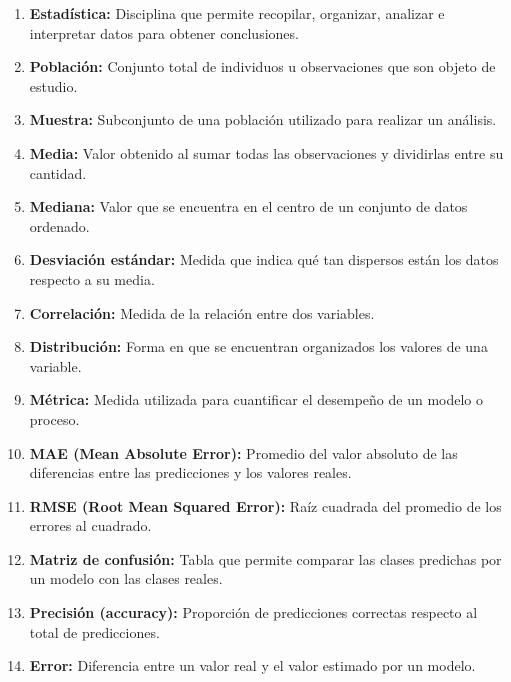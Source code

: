 \documentclass[11pt,letterpaper,DIV=12]{scrartcl}
\begin{document}
\begin{enumerate}
  \item \textbf{Estadística:} Disciplina que permite recopilar, organizar, analizar e interpretar datos para obtener conclusiones.
  \item \textbf{Población:} Conjunto total de individuos u observaciones que son objeto de estudio.
  \item \textbf{Muestra:} Subconjunto de una población utilizado para realizar un análisis.
  \item \textbf{Media:} Valor obtenido al sumar todas las observaciones y dividirlas entre su cantidad.
  \item \textbf{Mediana:} Valor que se encuentra en el centro de un conjunto de datos ordenado.
  \item \textbf{Desviación estándar:} Medida que indica qué tan dispersos están los datos respecto a su media.
  \item \textbf{Correlación:} Medida de la relación entre dos variables.
  \item \textbf{Distribución:} Forma en que se encuentran organizados los valores de una variable.
  \item \textbf{Métrica:} Medida utilizada para cuantificar el desempeño de un modelo o proceso.
  \item \textbf{MAE (Mean Absolute Error):} Promedio del valor absoluto de las diferencias entre las predicciones y los valores reales.
  \item \textbf{RMSE (Root Mean Squared Error):} Raíz cuadrada del promedio de los errores al cuadrado.
  \item \textbf{Matriz de confusión:} Tabla que permite comparar las clases predichas por un modelo con las clases reales.
  \item \textbf{Precisión (accuracy):} Proporción de predicciones correctas respecto al total de predicciones.
  \item \textbf{Error:} Diferencia entre un valor real y el valor estimado por un modelo.
\end{enumerate}

\printbibliography
\end{document}

